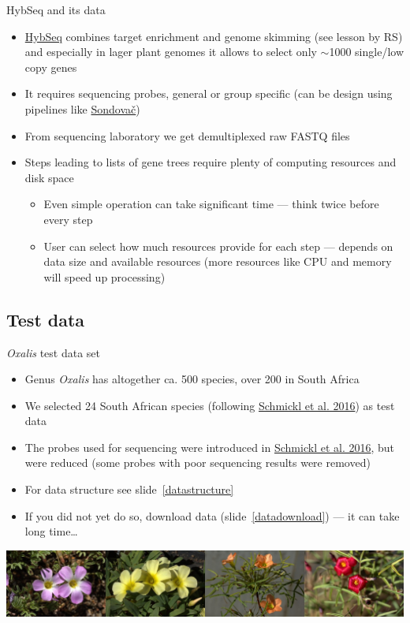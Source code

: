 \documentclass[compress, ucs, xelatex, 11pt, xcolor=x11names, aspectratio=1609,
	hyperref={
		bookmarks=true,
		unicode=true,
		colorlinks=true,
		pdftitle={HybSeq course},
		plainpages=false,
		pdfauthor={Vojtech Zeisek},
		pdfsubject={Practical processing of HybSeq target enrichment sequencing data on computing grids like MetaCentrum},
		pdfcreator={XeLaTeX},
		pdfkeywords={BASH, command line, GNU, HybSeq, Linux, MetaCentrum, sequencing shell, target enrichment},
		linkcolor=Cyan2, %
		anchorcolor=Firebrick2, %
		citecolor=Firebrick2, %
		filecolor=Firebrick2, %
		menucolor=Firebrick2, %
		urlcolor=Chartreuse2, %
		pdftex},
	url={hyphens, lowtilde} %
	]{beamer}
\begin{document}
\begin{frame}{HybSeq and its data}
	\begin{itemize}
		\item \href{https://bsapubs.onlinelibrary.wiley.com/doi/full/10.3732/apps.1400042}{HybSeq} combines target enrichment and genome skimming (see lesson by RS) and especially in lager plant genomes it allows to select only $\sim$1000 single/low copy genes
		\item It requires sequencing probes, general or group specific (can be design using pipelines like \href{https://github.com/V-Z/sondovac/wiki}{Sondovač})
		\item From sequencing laboratory we get demultiplexed raw FASTQ files
		\item Steps leading to lists of gene trees require plenty of computing resources and disk space
		\begin{itemize}
			\item Even simple operation can take significant time --- think twice before every step
			\item User can select how much resources provide for each step --- depends on data size and available resources (more resources like CPU and memory will speed up processing)
		\end{itemize}
	\end{itemize}
\end{frame}

\subsection{Test data}

\begin{frame}{\textit{Oxalis} test data set}
	\begin{itemize}
		\item Genus \textit{Oxalis} has altogether ca. 500 species, over 200 in South Africa
		\item We selected 24 South African species (following \href{https://onlinelibrary.wiley.com/doi/full/10.1111/1755-0998.12487}{Schmickl et al. 2016}) as test data
		\item The probes used for sequencing were introduced in \href{https://onlinelibrary.wiley.com/doi/full/10.1111/1755-0998.12487}{Schmickl et al. 2016}, but were reduced (some probes with poor sequencing results were removed)
		\item For data structure see slide~\ref{datastructure}
		\item If you did not yet do so, download data (slide~\ref{datadownload}) --- it can take long time\ldots
	\end{itemize}
	\vfill
	\includegraphics[width=\textwidth]{oxalis.jpg}
\end{frame}
\end{document}
